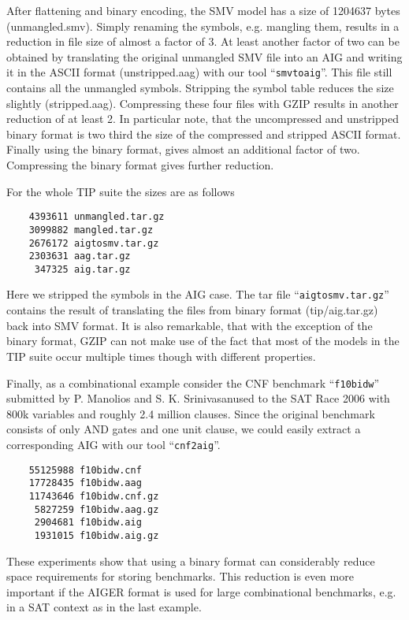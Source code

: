 \documentclass{llncs}
\begin{document}
  After flattening and binary encoding, the SMV model has a size of 1204637
  bytes (unmangled.smv).  Simply renaming the symbols, e.g. mangling them,
  results in a reduction in file size of almost a factor of 3.  At least
  another factor of two can be obtained by translating the original
  unmangled SMV file into an AIG and writing it in the ASCII format
  (unstripped.aag) with our tool ``\texttt{smvtoaig}''.  This file still contains all
  the unmangled symbols.  Stripping the symbol table reduces the size
  slightly (stripped.aag).  Compressing these four files with GZIP results
  in another reduction of at least 2.  In particular note, that the
  uncompressed and unstripped binary format is two third the size of the
  compressed and stripped ASCII format.  Finally using the binary format,
  gives almost an additional factor of two.  Compressing the binary format
  gives further reduction.

  For the whole TIP suite the sizes are as follows

\begin{verbatim}
    4393611 unmangled.tar.gz
    3099882 mangled.tar.gz
    2676172 aigtosmv.tar.gz
    2303631 aag.tar.gz
     347325 aig.tar.gz
\end{verbatim}

  Here we stripped the symbols in the AIG case.  The tar file
  ``\texttt{aigtosmv.tar.gz}'' contains the result of translating the files from binary
  format (tip/aig.tar.gz) back into SMV format.  It is also remarkable, that
  with the exception of the binary format, GZIP can not make use of the fact
  that most of the models in the TIP suite occur multiple times though with
  different properties.

  Finally, as a combinational example consider the CNF benchmark
  ``\texttt{f10bidw}''
  submitted by P. Manolios and S. K. Srinivasanused to the SAT Race 2006
  with 800k variables and roughly 2.4 million clauses.  Since the original
  benchmark consists of only AND gates and one unit clause, we could easily
  extract a corresponding AIG with our tool ``\texttt{cnf2aig}''.

\begin{verbatim}
    55125988 f10bidw.cnf
    17728435 f10bidw.aag
    11743646 f10bidw.cnf.gz
     5827259 f10bidw.aag.gz
     2904681 f10bidw.aig
     1931015 f10bidw.aig.gz
\end{verbatim}

  These experiments show that using a binary format can considerably reduce
  space requirements for storing benchmarks.  This reduction is even more
  important if the AIGER format is used for large combinational benchmarks,
  e.g. in a SAT context as in the last example.
  
\end{document}
